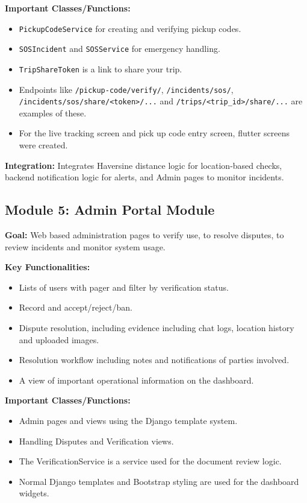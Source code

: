 \textbf{Important Classes/Functions:}
\begin{itemize}
    \item \texttt{PickupCodeService} for creating and verifying pickup codes.
    \item \texttt{SOSIncident} and \texttt{SOSService} for emergency handling.
    \item \texttt{TripShareToken} is a link to share your trip.
    \item Endpoints like \texttt{/pickup-code/verify/}, \texttt{/incidents/sos/}, \texttt{/incidents/sos/share/<token>/...} and \texttt{/trips/<trip\_id>/share/...} are examples of these.
    \item For the live tracking screen and pick up code entry screen, flutter screens were created.
\end{itemize}

\textbf{Integration:} Integrates Haversine distance logic for location-based checks, backend notification logic for alerts, and Admin pages to monitor incidents.

\subsection{Module 5: Admin Portal Module}

\textbf{Goal:} Web based administration pages to verify use, to resolve disputes, to review incidents and monitor system usage.

\textbf{Key Functionalities:}
\begin{itemize}
    \item Lists of users with pager and filter by verification status.
    \item Record and accept/reject/ban.
    \item Dispute resolution, including evidence including chat logs, location history and uploaded images.
    \item Resolution workflow including notes and notifications of parties involved.
    \item A view of important operational information on the dashboard.
\end{itemize}

\textbf{Important Classes/Functions:}
\begin{itemize}
    \item Admin pages and views using the Django template system.
    \item Handling Disputes and Verification views.
    \item The VerificationService is a service used for the document review logic.
    \item Normal Django templates and Bootstrap styling are used for the dashboard widgets.
\end{itemize}

